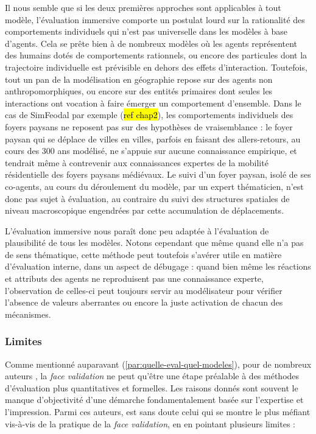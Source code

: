Il nous semble que si les deux premières approches sont applicables à tout modèle, l'évaluation immersive comporte un postulat lourd sur la rationalité des comportements individuels qui n'est pas universelle dans les modèles à base d'agents.
Cela se prête bien à de nombreux modèles où les agents représentent des humains dotés de comportements rationnels, ou encore des particules dont la trajectoire individuelle est prévisible en dehors des effets d'interaction.
Toutefois, tout un pan de la modélisation en géographie repose sur des agents non anthropomorphiques, ou encore sur des entités primaires dont seules les interactions ont vocation à faire émerger un comportement d'ensemble.
Dans le cas de SimFeodal par exemple (\hl{ref chap2}), les comportements individuels des foyers paysans ne reposent pas sur des hypothèses de vraisemblance : le foyer paysan qui se déplace de villes en villes, parfois en faisant des allers-retours, au cours des 300 ans modélisé, ne s'appuie sur aucune connaissance empirique, et tendrait même à contrevenir aux connaissances expertes de la mobilité résidentielle des foyers paysans médiévaux.
Le suivi d'un foyer paysan, isolé de ses co-agents, au cours du déroulement du modèle, par un expert thématicien, n'est donc pas sujet à évaluation, au contraire du suivi des structures spatiales de niveau macroscopique engendrées par cette accumulation de déplacements.

L'évaluation immersive nous paraît donc peu adaptée à l'évaluation de plausibilité de tous les modèles.
Notons cependant que même quand elle n'a pas de sens thématique, cette méthode peut toutefois s'avérer utile en matière d'évaluation interne, dans un aspect de \og débugage\fg{} : quand bien même les réactions et attributs des agents ne reproduisent pas une connaissance experte, l'observation de celles-ci peut toujours servir au modélisateur pour vérifier l'absence de valeurs aberrantes ou encore la juste activation de chacun des mécanismes.


\subsubsection{Limites}

Comme mentionné auparavant (\ref{par:quelle-eval-quel-modeles}), pour de nombreux auteurs \autocite{hermann_validation_1967, balci_validation_1994, kennedy_verification_2006}, la \textit{face validation} ne peut qu'être une étape préalable à des méthodes d'évaluation plus quantitatives et formelles.
Les raisons donnés sont souvent le manque d'objectivité d'une démarche fondamentalement basée sur l'expertise et l'impression.
Parmi ces auteurs, \citeauthor{hermann_validation_1967} est sans doute celui qui se montre le plus méfiant vis-à-vis de la pratique de la \textit{face validation}, en en pointant plusieurs limites :

